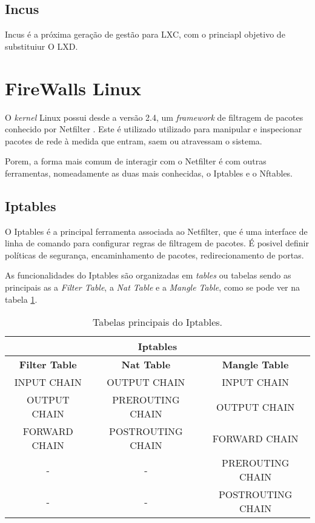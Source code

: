 \subsection{Incus}

Incus é a próxima geração de gestão para LXC, com o princiapl objetivo de substituiur
O LXD.

\section{FireWalls Linux}

O \textit{kernel} Linux possui desde a versão 2.4, um \textit{framework} de filtragem de pacotes 
conhecido por Netfilter \cite{netfilter}. Este é utilizado utilizado para manipular e inspecionar 
pacotes de rede à medida que entram, saem ou atravessam o sistema.

Porem, a forma mais comum de interagir com o Netfilter é com outras ferramentas,
nomeadamente as duas mais conhecidas, o Iptables e o Nftables.

\subsection{Iptables}

O Iptables é a principal ferramenta associada ao Netfilter, que é uma interface
de linha de comando para configurar regras de filtragem de pacotes.
É posivel definir políticas de segurança, encaminhamento de pacotes,
redirecionamento de portas. 

As funcionalidades do Iptables são organizadas em \textit{tables} ou tabelas
sendo as principais as a \textit{Filter Table}, a \textit{Nat Table} e a
\textit{Mangle Table}, como se pode ver na tabela \ref{ipt1}.

\begin{table}[h]
\centering
\begin{tabular}{|c|c|c|}
\hline
\multicolumn{3}{|c|}{Iptables}\\
\hline
\rowcolor{yellow!50}\textbf{Filter Table} & \textbf{Nat Table} & \textbf{Mangle Table}\\
\hline
INPUT CHAIN & OUTPUT CHAIN & INPUT CHAIN\\
\hline
OUTPUT CHAIN & PREROUTING CHAIN & OUTPUT CHAIN\\
\hline
FORWARD CHAIN & POSTROUTING CHAIN & FORWARD CHAIN\\
\hline
- & - & PREROUTING CHAIN\\
\hline
- & - & POSTROUTING CHAIN\\
\hline
\end{tabular}
\caption{Tabelas principais do Iptables.}
\label{ipt1}
\end{table}


